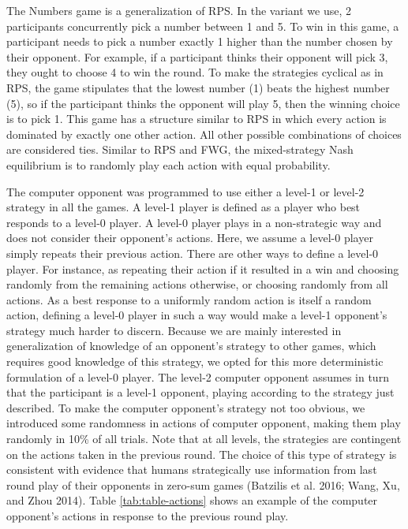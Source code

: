 \documentclass[smallextended]{svjour3}       %
\begin{document}
The Numbers game is a generalization of RPS. In the variant we use, 2
participants concurrently pick a number between 1 and 5. To win in this
game, a participant needs to pick a number exactly 1 higher than the
number chosen by their opponent. For example, if a participant thinks
their opponent will pick 3, they ought to choose 4 to win the round. To
make the strategies cyclical as in RPS, the game stipulates that the
lowest number (1) beats the highest number (5), so if the participant
thinks the opponent will play 5, then the winning choice is to pick 1.
This game has a structure similar to RPS in which every action is
dominated by exactly one other action. All other possible combinations
of choices are considered ties. Similar to RPS and FWG, the
mixed-strategy Nash equilibrium is to randomly play each action with
equal probability.

The computer opponent was programmed to use either a level-1 or level-2
strategy in all the games. A level-1 player is defined as a player who
best responds to a level-0 player. A level-0 player plays in a
non-strategic way and does not consider their opponent's actions. Here,
we assume a level-0 player simply repeats their previous action. There
are other ways to define a level-0 player. For instance, as repeating
their action if it resulted in a win and choosing randomly from the
remaining actions otherwise, or choosing randomly from all actions. As a
best response to a uniformly random action is itself a random action,
defining a level-0 player in such a way would make a level-1 opponent's
strategy much harder to discern. Because we are mainly interested in
generalization of knowledge of an opponent's strategy to other games,
which requires good knowledge of this strategy, we opted for this more
deterministic formulation of a level-0 player. The level-2 computer
opponent assumes in turn that the participant is a level-1 opponent,
playing according to the strategy just described. To make the computer
opponent's strategy not too obvious, we introduced some randomness in
actions of computer opponent, making them play randomly in 10\% of all
trials. Note that at all levels, the strategies are contingent on the
actions taken in the previous round. The choice of this type of strategy
is consistent with evidence that humans strategically use information
from last round play of their opponents in zero-sum games (Batzilis et
al. 2016; Wang, Xu, and Zhou 2014). Table \ref{tab:table-actions} shows
an example of the computer opponent's actions in response to the
previous round play.
\end{document}
